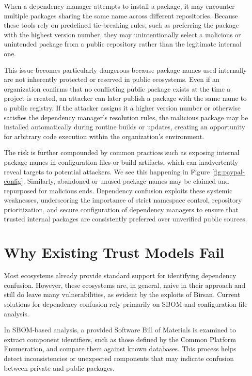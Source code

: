 When a dependency manager attempts to install a package, it may encounter multiple packages sharing the same name across different repositories. Because these tools rely on predefined tie-breaking rules, such as preferring the package with the highest version number, they may unintentionally select a malicious or unintended package from a public repository rather than the legitimate internal one.

This issue becomes particularly dangerous because package names used internally are not inherently protected or reserved in public ecosystems. Even if an organization confirms that no conflicting public package exists at the time a project is created, an attacker can later publish a package with the same name to a public registry. If the attacker assigns it a higher version number or otherwise satisfies the dependency manager's resolution rules, the malicious package may be installed automatically during routine builds or updates, creating an opportunity for arbitrary code execution within the organization's environment.

The risk is further compounded by common practices such as exposing internal package names in configuration files or build artifacts, which can inadvertently reveal targets to potential attackers. We see this happening in Figure \ref{fig:paypal-config}. Similarly, abandoned or unused package names may be claimed and repurposed for malicious ends. Dependency confusion exploits these systemic weaknesses, underscoring the importance of strict namespace control, repository prioritization, and secure configuration of dependency managers to ensure that trusted internal packages are consistently preferred over unverified public sources.

\section{Why Existing Trust Models Fail}

Most ecosystems already provide standard support for identifying dependency confusion. However, these ecosystems are, in general, naive in their approach and still do leave many vulnerabilities, as evident by the exploits of Birsan. Current solutions for dependency confusion rely primarily on SBOM and configuration file analysis.

In SBOM-based analysis, a provided Software Bill of Materials is examined to extract component identifiers, such as those defined by the Common Platform Enumeration, and compare them against known databases. This process helps detect inconsistencies or unexpected components that may indicate confusion between private and public packages.

